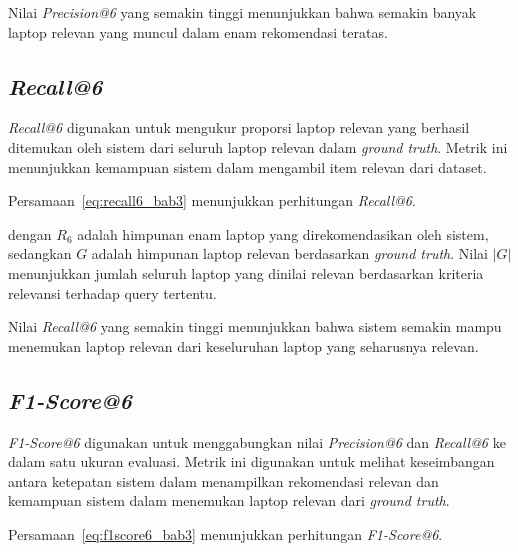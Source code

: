 Nilai \textit{Precision@6} yang semakin tinggi menunjukkan bahwa semakin banyak laptop relevan yang muncul dalam enam rekomendasi teratas.

\subsection{\textit{Recall@6}}
\textit{Recall@6} digunakan untuk mengukur proporsi laptop relevan yang berhasil ditemukan oleh sistem dari seluruh laptop relevan dalam \textit{ground truth}. Metrik ini menunjukkan kemampuan sistem dalam mengambil item relevan dari dataset.

Persamaan~\ref{eq:recall6_bab3} menunjukkan perhitungan \textit{Recall@6}.


\noindent dengan $R_6$ adalah himpunan enam laptop yang direkomendasikan oleh sistem, sedangkan $G$ adalah himpunan laptop relevan berdasarkan \textit{ground truth}. Nilai $|G|$ menunjukkan jumlah seluruh laptop yang dinilai relevan berdasarkan kriteria relevansi terhadap query tertentu.

Nilai \textit{Recall@6} yang semakin tinggi menunjukkan bahwa sistem semakin mampu menemukan laptop relevan dari keseluruhan laptop yang seharusnya relevan.

\subsection{\textit{F1-Score@6}}
\textit{F1-Score@6} digunakan untuk menggabungkan nilai \textit{Precision@6} dan \textit{Recall@6} ke dalam satu ukuran evaluasi. Metrik ini digunakan untuk melihat keseimbangan antara ketepatan sistem dalam menampilkan rekomendasi relevan dan kemampuan sistem dalam menemukan laptop relevan dari \textit{ground truth}.

Persamaan~\ref{eq:f1score6_bab3} menunjukkan perhitungan \textit{F1-Score@6}.


